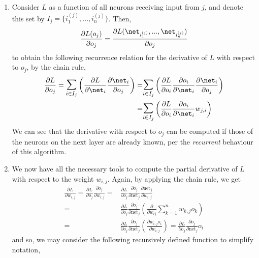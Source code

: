 \documentclass{article}
\begin{document}
\begin{enumerate}
    \item Consider $L$ as a function of all neurons receiving input from $j$, and denote this set by $I_j =\{ i_1^{(j)}, ..., i_n^{(j)}\}$. Then, 
    $$\frac{\partial {L(o_j)}}{\partial {o_j}} = \frac{\partial {L(\net_{i_1^{(j)}}, ..., \net_{i_n^{(j)}})}}{\partial {o_j}} {} $$
    to obtain the following recurrence relation for the derivative of $L$ with respect to $o_j$, by the chain rule, 
    \begin{equation}\label{deriv_o_j}
      \begin{split}
        \frac{\partial {L}}{\partial {o_j}} = \mathlarger{\mathlarger{\sum}}^{}_{i \in I_j} \left( \frac{\partial {L}}{\partial {\net_i}} \frac{\partial {\net_i}}{\partial {o_j}}  \right)  =&  \mathlarger{\mathlarger{\sum}}^{}_{i \in I_j} \left( \frac{\partial {L}}{\partial {o_i}} \frac{\partial {o_i}}{\partial {\net_i}} \frac{\partial {\net_i }}{\partial {o_j}} \right) \\ =&\mathlarger{\mathlarger{\sum}}^{}_{i \in I_j} \left( \frac{\partial {L}}{\partial {o_i}} \frac{\partial {o_i}}{\partial {\net_i}} w_{j,i}\right) 
      \end{split}
    \end{equation}
    We can see that the derivative with respect to $o_j$ can be computed if those of the neurons on the next layer are already known, per the \textit{recurrent} behaviour of this algorithm. 
    \item We now have all the necessary tools to compute the partial derivative of $L$ with respect to the weight $w_{i,j}$. Again, by applying the chain rule, we get
    \begin{equation}\label{deriv_w}
  \begin{split}
    {\frac {\partial L}{\partial w_{i,j}}}={\frac {\partial L}{\partial o_{j}}}{\frac {\partial o_{j}}{\partial w_{i,j}}}=&{\frac {\partial L}{\partial o_{j}}}{\frac {\partial o_{j}}{\partial {\text{net}}_{j}}}{\frac {\partial {\text{net}}_{j}}{\partial w_{i,j}}}\\ 
    =& {\frac {\partial L}{\partial o_{j}}}{\frac {\partial o_{j}}{\partial {\text{net}}_{j}}} \left(\frac{\partial {}}{\partial {w_{ij}}} {\sum^{n}_{k=1} w_{k,j}o_k}\right) \\ 
    =&{\frac {\partial L}{\partial o_{j}}}{\frac {\partial o_{j}}{\partial {\text{net}}_{j}}} \left(\frac{\partial {w_{i,j} o_i}}{\partial {w_{i,j}}} \right)={\frac {\partial L}{\partial o_{j}}}{\frac {\partial o_{j}}{\partial {\text{net}}_{j}}} o_i
  \end{split}
\end{equation}
   and so, we may consider the following recursively defined function to simplify notation,


\end{enumerate}
\end{document}

